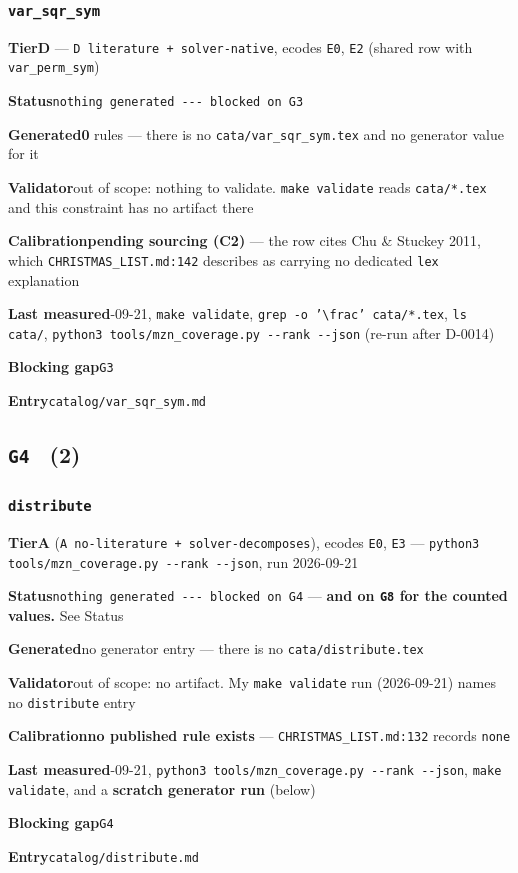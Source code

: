 \documentclass[10pt,a4paper]{article}
\newcommand{\entryfield}[2]{{\raggedright\textbf{#1}\quad #2\par}}
\begin{document}
\subsubsection*{\texttt{var\_\allowbreak{}sqr\_\allowbreak{}sym}}
\label{entry:var-sqr-sym}
\entryfield{Tier}{\textbf{D} --- \texttt{D literature + solver-\allowbreak{}native}, ecodes \texttt{E0}, \texttt{E2} (shared row with \texttt{var\_perm\_sym})}
\entryfield{Status}{\texttt{nothing generated -\allowbreak{}-\allowbreak{}-\allowbreak{} blocked on G3}}
\entryfield{Generated}{\textbf{0} rules --- there is no \texttt{cata/var\_sqr\_sym.tex} and no generator value for it}
\entryfield{Validator}{out of scope: nothing to validate. \texttt{make validate} reads \texttt{cata/*.tex} and this constraint has no artifact there}
\entryfield{Calibration}{\textbf{pending sourcing (C2)} --- the row cites Chu \& Stuckey 2011, which \texttt{CHRISTMAS\_LIST.md:142} describes as carrying no dedicated \texttt{lex} explanation}
\entryfield{Last measured}{2026-09-21, \texttt{make validate}, \texttt{grep -\allowbreak{}o '\textbackslash{}frac' cata/\allowbreak{}*.\allowbreak{}tex}, \texttt{ls cata/}, \texttt{python3 tools/\allowbreak{}mzn\_\allowbreak{}coverage.\allowbreak{}py -\allowbreak{}-\allowbreak{}rank -\allowbreak{}-\allowbreak{}json} (re-run after D-0014)}
\entryfield{Blocking gap}{\texttt{G3}}
\entryfield{Entry}{\texttt{catalog/var\_sqr\_sym.md}}
\subsection*{\texttt{G4} \ \normalsize(2)}
\subsubsection*{\texttt{distribute}}
\label{entry:distribute}
\entryfield{Tier}{\textbf{A} (\texttt{A no-\allowbreak{}literature + solver-\allowbreak{}decomposes}), ecodes \texttt{E0}, \texttt{E3} --- \texttt{python3 tools/\allowbreak{}mzn\_\allowbreak{}coverage.\allowbreak{}py -\allowbreak{}-\allowbreak{}rank -\allowbreak{}-\allowbreak{}json}, run 2026-09-21}
\entryfield{Status}{\texttt{nothing generated -\allowbreak{}-\allowbreak{}-\allowbreak{} blocked on G4} --- \textbf{and on \texttt{G8} for the counted values.} See Status}
\entryfield{Generated}{no generator entry --- there is no \texttt{cata/distribute.tex}}
\entryfield{Validator}{out of scope: no artifact. My \texttt{make validate} run (2026-09-21) names no \texttt{distribute} entry}
\entryfield{Calibration}{\textbf{no published rule exists} --- \texttt{CHRISTMAS\_LIST.md:132} records \texttt{none}}
\entryfield{Last measured}{2026-09-21, \texttt{python3 tools/\allowbreak{}mzn\_\allowbreak{}coverage.\allowbreak{}py -\allowbreak{}-\allowbreak{}rank -\allowbreak{}-\allowbreak{}json}, \texttt{make validate}, and a \textbf{scratch generator run} (below)}
\entryfield{Blocking gap}{\texttt{G4}}
\entryfield{Entry}{\texttt{catalog/distribute.md}}
\end{document}
